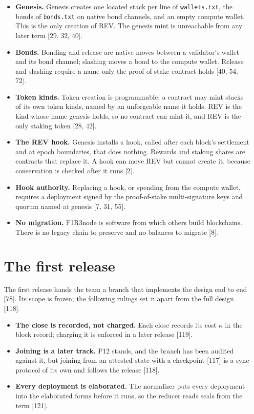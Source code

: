 \documentclass[10.5pt]{article}
\newcommand{\code}[1]{\texttt{#1}}
\newcommand{\D}[1]{{\color{muted}\small[#1]}}
\begin{document}
\begin{itemize}
\item \textbf{Genesis.} Genesis creates one located stack per line of \code{wallets.txt}, the bonds of \code{bonds.txt} on native bond channels, and an empty compute wallet. This is the only creation of REV. The genesis mint is unreachable from any later term \D{29, 32, 40}.
\item \textbf{Bonds.} Bonding and release are native moves between a validator's wallet and its bond channel; slashing moves a bond to the compute wallet. Release and slashing require a name only the proof-of-stake contract holds \D{40, 54, 72}.
\item \textbf{Token kinds.} Token creation is programmable: a contract may mint stacks of its own token kinds, named by an unforgeable name it holds. REV is the kind whose name genesis holds, so no contract can mint it, and REV is the only staking token \D{28, 42}.
\item \textbf{The REV hook.} Genesis installs a hook, called after each block's settlement and at epoch boundaries, that does nothing. Rewards and staking shares are contracts that replace it. A hook can move REV but cannot create it, because conservation is checked after it runs \D{2}.
\item \textbf{Hook authority.} Replacing a hook, or spending from the compute wallet, requires a deployment signed by the proof-of-stake multi-signature keys and quorum named at genesis \D{7, 31, 55}.
\item \textbf{No migration.} F1R3node is software from which others build blockchains. There is no legacy chain to preserve and no balances to migrate \D{8}.
\end{itemize}

\section{The first release}\label{sec:release}

The first release hands the team a branch that implements the design end to end \D{78}. Its scope is frozen; the following rulings set it apart from the full design \D{118}.

\begin{itemize}
\item \textbf{The close is recorded, not charged.} Each close records its cost $\kappa$ in the block record; charging it is enforced in a later release \D{119}.
\item \textbf{Joining is a later track.} P12 stands, and the branch has been audited against it, but joining from an attested state with a checkpoint \D{117} is a sync protocol of its own and follows the release \D{118}.
\item \textbf{Every deployment is elaborated.} The normalizer puts every deployment into the elaborated forms before it runs, so the reducer reads seals from the term \D{121}.
\end{itemize}
\end{document}
